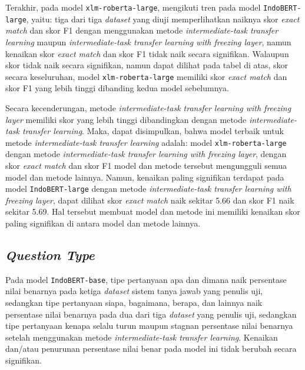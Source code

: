 Terakhir, pada model \texttt{xlm-roberta-large}, mengikuti tren pada model \texttt{IndoBERT-large}, yaitu: tiga dari tiga \emph{dataset} yang diuji memperlihatkan naiknya skor \emph{exact match} dan skor F1 dengan menggunakan metode \emph{intermediate-task transfer learning} maupun \emph{intermediate-task transfer learning with freezing layer}, namun kenaikan skor \emph{exact match} dan skor F1 tidak naik secara signifikan. Walaupun skor tidak naik secara signifikan, namun dapat dilihat pada tabel di atas, skor secara keseluruhan, model \texttt{xlm-roberta-large} memiliki skor \emph{exact match} dan skor F1 yang lebih tinggi dibanding kedua model sebelumnya.

Secara kecenderungan, metode \emph{intermediate-task transfer learning with freezing layer} memiliki skor yang lebih tinggi dibandingkan dengan metode \emph{intermediate-task transfer learning}. Maka, dapat disimpulkan, bahwa model terbaik untuk metode \emph{intermediate-task transfer learning} adalah: model \texttt{xlm-roberta-large} dengan metode \emph{intermediate-task transfer learning with freezing layer}, dengan skor \emph{exact match} dan skor F1 model dan metode tersebut mengungguli semua model dan metode lainnya. Namun, kenaikan paling signifikan terdapat pada model \texttt{IndoBERT-large} dengan metode \emph{intermediate-task transfer learning with freezing layer}, dapat dilihat skor \emph{exact match} naik sekitar 5.66 dan skor F1 naik sekitar 5.69. Hal tersebut membuat model dan metode ini memiliki kenaikan skor paling signifikan di antara model dan metode lainnya.

\subsection{\emph{Question Type}}
Pada model \texttt{IndoBERT-base}, tipe pertanyaan apa dan dimana naik persentase nilai benarnya pada ketiga \emph{dataset} sistem tanya jawab yang penulis uji, sedangkan tipe pertanyaan siapa, bagaimana, berapa, dan lainnya naik persentase nilai benarnya pada dua dari tiga \emph{dataset} yang penulis uji, sedangkan tipe pertanyaan kenapa selalu turun maupun stagnan persentase nilai benarnya setelah menggunakan metode \emph{intermediate-task transfer learning}. Kenaikan dan/atau penurunan persentase nilai benar pada model ini tidak berubah secara signifikan.


